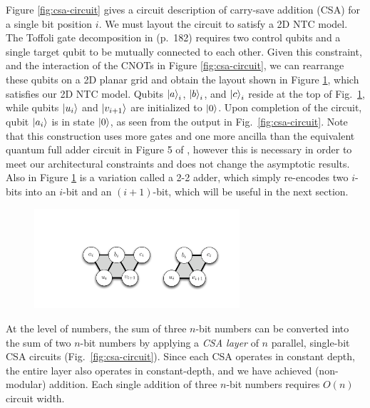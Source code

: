 \documentclass[twoside]{article}
\begin{document}
Figure \ref{fig:csa-circuit} gives a circuit description of carry-save addition (CSA) for a single bit position $i$.
We must layout the circuit to satisfy a 2D NTC model.
The Toffoli gate decomposition in \cite{Nielsen2000} (p.~182) requires two control
qubits and a single target qubit to be
mutually connected to each other. Given this constraint, and the
interaction of the CNOTs in Figure \ref{fig:csa-circuit}, we can
rearrange these qubits on a 2D planar grid and obtain the layout shown
in Figure \ref{fig:csa-3-2}, which satisfies our 2D NTC model.
Qubits $\left\vert{a}\right\rangle_i$, $\left\vert{b}\right\rangle_i$, and $\left\vert{c}\right\rangle_i$ reside at the top of Fig.~\ref{fig:csa-3-2}, while qubits $\left\vert{u_i}\right\rangle$ and $\left\vert{v_{i+1}}\right\rangle$ are initialized to $\left\vert{0}\right\rangle$.
Upon completion of the circuit, qubit $\left\vert{a_i}\right\rangle$ is in state $\left\vert{0}\right\rangle$, as seen from the output in Fig.~\ref{fig:csa-circuit}. 
Note that this construction uses more gates and one more ancilla than the equivalent
quantum full adder circuit in Figure 5 of \cite{Gossett1998}, however this
is necessary in order to meet our architectural constraints and does not change the
asymptotic results.
Also in Figure \ref{fig:csa-3-2}
is a variation called a 2-2 adder, which simply re-encodes two $i$-bits
into an $i$-bit and an $(i+1)$-bit, which will be useful in the next section.

\begin{figure}[b!]
\begin{center}
\includegraphics[width=3in]{./csa-32-22.pdf}
\end{center}
\label{fig:csa-3-2}
\end{figure}

At the level of numbers, the sum of three $n$-bit numbers can be converted into
the sum of two $n$-bit numbers by applying a \emph{CSA layer} of
$n$ parallel, single-bit
CSA circuits (Fig.~\ref{fig:csa-circuit}). Since each CSA operates in constant depth, the entire layer also
operates in constant-depth, and we have achieved (non-modular) addition.
%
Each single addition of three $n$-bit numbers requires $O(n)$ circuit width.
\end{document}

